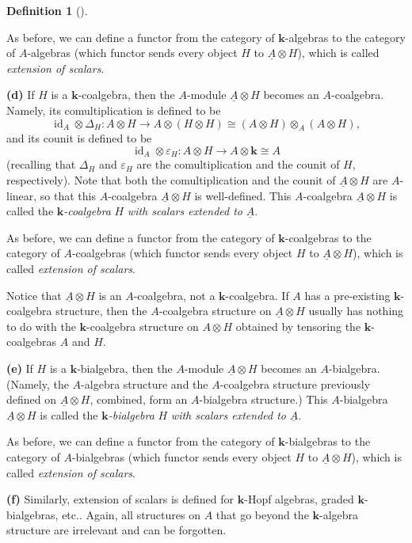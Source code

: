 \documentclass[numbers=enddot,12pt,final,onecolumn,notitlepage,abstracton]{scrartcl}%
\theoremstyle{definition}
\newtheorem{defi}[theo]{Definition}
\newenvironment{definition}[1][]
{\begin{defi}[#1]\begin{leftbar}}
{\end{leftbar}\end{defi}}
\begin{document}
\begin{definition}
As before, we can define a functor from the category of $\mathbf{k}$-algebras
to the category of $A$-algebras (which functor sends every object $H$ to
$\underline{A}\otimes H$), which is called \textit{extension of scalars}.

\textbf{(d)} If $H$ is a $\mathbf{k}$-coalgebra, then the $A$-module
$\underline{A}\otimes H$ becomes an $A$-coalgebra. Namely, its
comultiplication is defined to be%
\[
\operatorname*{id}\nolimits_{A}\otimes\Delta_{H}:A\otimes H\rightarrow
A\otimes\left(  H\otimes H\right)  \cong\left(  A\otimes H\right)  \otimes
_{A}\left(  A\otimes H\right)  ,
\]
and its counit is defined to be%
\[
\operatorname*{id}\nolimits_{A}\otimes\varepsilon_{H}:A\otimes H\rightarrow
A\otimes\mathbf{k}\cong A
\]
(recalling that $\Delta_{H}$ and $\varepsilon_{H}$ are the comultiplication
and the counit of $H$, respectively). Note that both the comultiplication and
the counit of $\underline{A}\otimes H$ are $A$-linear, so that this
$A$-coalgebra $\underline{A}\otimes H$ is well-defined. This $A$-coalgebra
$\underline{A}\otimes H$ is called the $\mathbf{k}$\textit{-coalgebra }%
$H$\textit{ with scalars extended to }$\underline{A}$.

As before, we can define a functor from the category of $\mathbf{k}%
$-coalgebras to the category of $A$-coalgebras (which functor sends every
object $H$ to $\underline{A}\otimes H$), which is called \textit{extension of
scalars}.

Notice that $\underline{A}\otimes H$ is an $A$-coalgebra, not a $\mathbf{k}%
$-coalgebra. If $A$ has a pre-existing $\mathbf{k}$-coalgebra structure, then
the $A$-coalgebra structure on $\underline{A}\otimes H$ usually has nothing to
do with the $\mathbf{k}$-coalgebra structure on $A\otimes H$ obtained by
tensoring the $\mathbf{k}$-coalgebras $A$ and $H$.

\textbf{(e)} If $H$ is a $\mathbf{k}$-bialgebra, then the $A$-module
$\underline{A}\otimes H$ becomes an $A$-bialgebra. (Namely, the $A$-algebra
structure and the $A$-coalgebra structure previously defined on $\underline{A}%
\otimes H$, combined, form an $A$-bialgebra structure.) This $A$-bialgebra
$\underline{A}\otimes H$ is called the $\mathbf{k}$\textit{-bialgebra }%
$H$\textit{ with scalars extended to }$\underline{A}$.

As before, we can define a functor from the category of $\mathbf{k}%
$-bialgebras to the category of $A$-bialgebras (which functor sends every
object $H$ to $\underline{A}\otimes H$), which is called \textit{extension of
scalars}.

\textbf{(f)} Similarly, extension of scalars is defined for $\mathbf{k}$-Hopf
algebras, graded $\mathbf{k}$-bialgebras, etc.. Again, all structures on $A$
that go beyond the $\mathbf{k}$-algebra structure are irrelevant and can be forgotten.
\end{definition}
\end{document}
